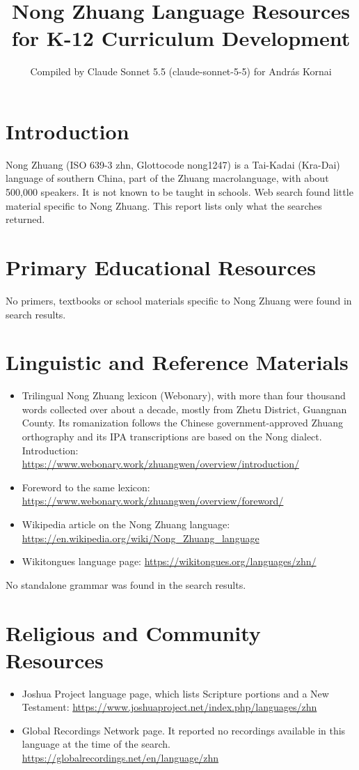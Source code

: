 \documentclass[12pt]{article}
\title{Nong Zhuang Language Resources for K-12 Curriculum Development}
\author{Compiled by Claude Sonnet 5.5 (claude-sonnet-5-5) for Andr\'as Kornai}
\date{}
\begin{document}
\maketitle

\section{Introduction}
Nong Zhuang (ISO 639-3 zhn, Glottocode nong1247) is a Tai-Kadai (Kra-Dai) language of southern China, part of the Zhuang macrolanguage, with about 500,000 speakers. It is not known to be taught in schools. Web search found little material specific to Nong Zhuang. This report lists only what the searches returned.

\section{Primary Educational Resources}
No primers, textbooks or school materials specific to Nong Zhuang were found in search results.

\section{Linguistic and Reference Materials}
\begin{itemize}
\item Trilingual Nong Zhuang lexicon (Webonary), with more than four thousand words collected over about a decade, mostly from Zhetu District, Guangnan County. Its romanization follows the Chinese government-approved Zhuang orthography and its IPA transcriptions are based on the Nong dialect. Introduction: \url{https://www.webonary.work/zhuangwen/overview/introduction/}
\item Foreword to the same lexicon: \url{https://www.webonary.work/zhuangwen/overview/foreword/}
\item Wikipedia article on the Nong Zhuang language: \url{https://en.wikipedia.org/wiki/Nong_Zhuang_language}
\item Wikitongues language page: \url{https://wikitongues.org/languages/zhn/}
\end{itemize}
No standalone grammar was found in the search results.

\section{Religious and Community Resources}
\begin{itemize}
\item Joshua Project language page, which lists Scripture portions and a New Testament: \url{https://www.joshuaproject.net/index.php/languages/zhn}
\item Global Recordings Network page. It reported no recordings available in this language at the time of the search. \url{https://globalrecordings.net/en/language/zhn}
\end{itemize}
\end{document}
